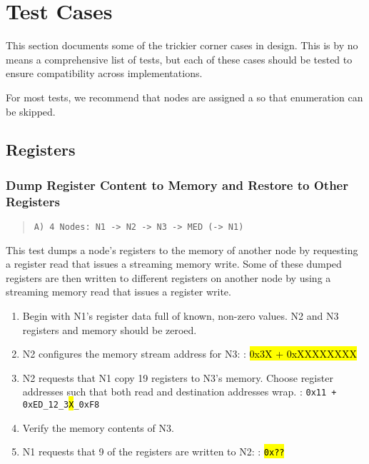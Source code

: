 \section{Test Cases}
\label{appx-tests}
This section documents some of the trickier corner cases in \bus design. This
is by no means a comprehensive list of tests, but each of these cases should
be tested to ensure compatibility across \bus implementations.

For most tests, we recommend that nodes are assigned a
 so that enumeration can be
skipped.

\subsection{Registers}

\subsubsection{Dump Register Content to Memory and Restore to Other Registers}
\label{test:reg-dump-restore}

\begin{quote}
  \texttt{A) 4 Nodes: N1 -> N2 -> N3 -> MED (-> N1)}
\end{quote}

This test dumps a node's registers to the memory of another node by requesting
a register read that issues a streaming memory write. Some of these dumped
registers are then written to different registers on another node by using a
streaming memory read that issues a register write.

\begin{enumerate}
  \item Begin with N1's register data full of known, non-zero values. N2 and
    N3 registers and memory should be zeroed.
  \item N2 configures the memory stream address for N3:
    \subitem {}: \hl{0x3X + 0xXXXXXXXX}
  \item N2 requests that N1 copy 19 registers to N3's memory. Choose register
    addresses such that both read and destination addresses wrap.
    \subitem {}: \texttt{0x11 + 0xED\_12\_3\hl{X}\_0xF8}
  \item Verify the memory contents of N3.
  \item N1 requests that 9 of the registers are written to N2:
    \subitem {}: \texttt{\hl{0x??}}
\end{enumerate}

